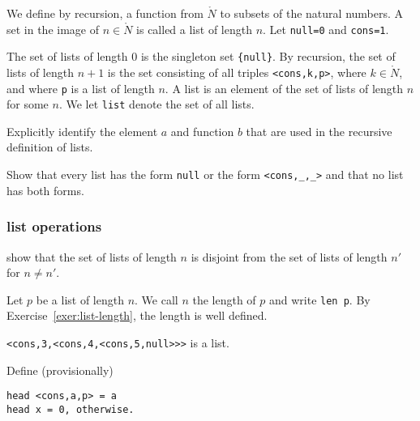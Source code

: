 We define by recursion, a function from $\ring{N}$ to subsets of the natural numbers.  A set in the image of $n\in\ring{N}$ is called a list of length $n$.  Let \verb!null=0! and \verb!cons=1!.

\begin{definition}
The set of lists of length $0$ is the singleton set \verb!{null}!.  By recursion, the set of  lists of length $n+1$ is the set
consisting of all  triples \verb!<cons,k,p>!, where $k\in\ring{N}$, and where \verb!p! is a  list of length $n$.   A  list is an element of the set of  lists of length $n$ for some $n$.  We let \verb!list! denote the set of all  lists.
\end{definition}

\begin{exer} Explicitly identify the element $a$ and function $b$ that are used in the recursive definition of  lists.
\end{exer}

\begin{exer} Show that every list has the form \verb!null! or the form \verb!<cons,_,_>! and that no list has both forms.
\end{exer}


\subsubsection{list operations}

\begin{exer}\label{exer:list-length} show that the set of  lists of length $n$ is disjoint from the set of  lists of length $n'$ for $n\ne n'$.
\end{exer}

\begin{definition} Let $p$ be a  list of length $n$.  We call $n$ the length of $p$ and write \verb!len p!.  By Exercise~\ref{exer:list-length}, the length is well defined.
\end{definition}


\begin{example}
\verb!<cons,3,<cons,4,<cons,5,null>>>!
is a  list.
\end{example}

\begin{definition} Define (provisionally)
\begin{verbatim}
head <cons,a,p> = a
head x = 0, otherwise.
\end{verbatim}
\end{definition}

